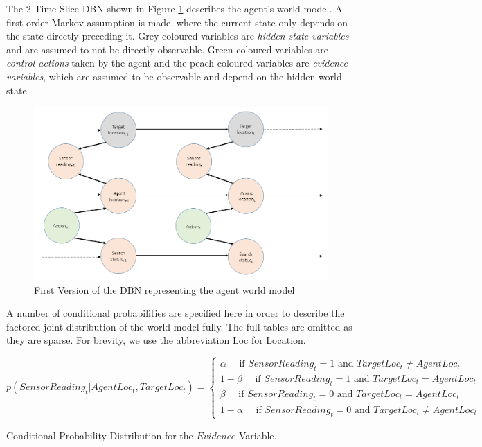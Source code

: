 The 2-Time Slice DBN shown in Figure \ref{fig:FirstDBNUsed} describes the agent's world model. A first-order Markov assumption is made, where the current state only depends on the state directly preceding it. Grey coloured variables are \textit{hidden state variables} and are assumed to not be directly observable. Green coloured variables are \textit{control actions} taken by the agent and the peach coloured variables are \textit{evidence variables}, which are assumed to be observable and depend on the hidden world state. 
\begin{figure}
    \centering
    \includegraphics[width = 0.9\linewidth]{Chapters/MultiAgentTargetDetection/Figs/DBNs/DBNWithMultipleObservable.PNG}
     \caption{First Version of the DBN representing the agent world model}
    \label{fig:FirstDBNUsed}
\end{figure}
A number of conditional probabilities are specified here in order to describe the factored joint distribution of the world model fully. The full tables are omitted as they are sparse. For brevity, we use the abbreviation Loc for Location.



\scriptsize
\begin{equation}\label{eqn:EvidenceVarsProbs}
    p(SensorReading_t | AgentLoc_{t}, TargetLoc_{t})  = 
    \begin{cases}
    \alpha \quad \text{ if } SensorReading_t=1 \text{ and } TargetLoc_t \neq AgentLoc_t
    \\
    1-\beta \quad \text{ if } SensorReading_t=1 \text{ and } TargetLoc_t = AgentLoc_t
    \\
    \beta \quad \text{ if } SensorReading_t=0 \text{ and } TargetLoc_t = AgentLoc_t
    \\
    1-\alpha \quad \text{ if } SensorReading_t=0 \text{ and } TargetLoc_t \neq AgentLoc_t
    \end{cases}
\end{equation}
\begin{center}
    \normalsize
    Conditional Probability Distribution for the $Evidence$ Variable.
\end{center}



